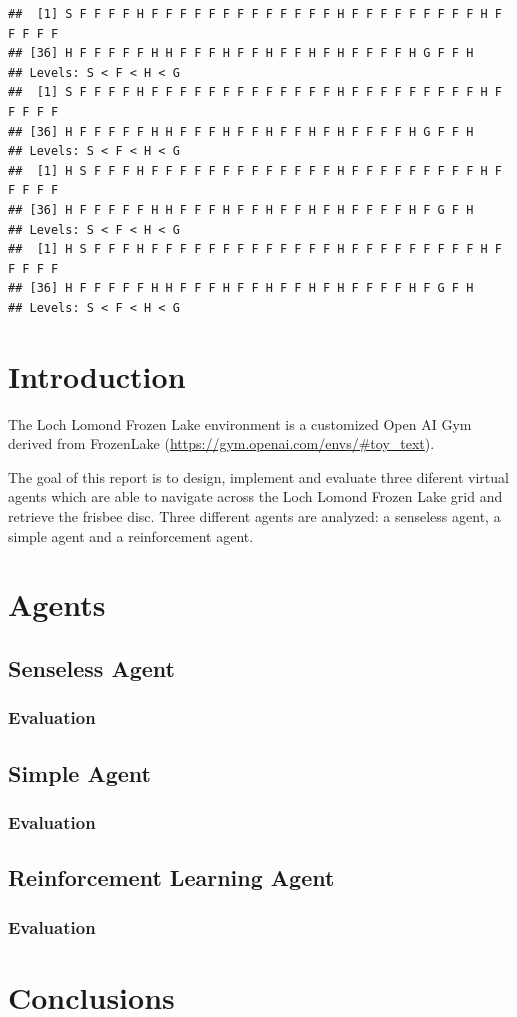 \documentclass[11pt,]{article}
\begin{document}
\begin{verbatim}
##  [1] S F F F F H F F F F F F F F F F F F F H F F F F F F F F F H F F F F F
## [36] H F F F F F H H F F F H F F H F F H F H F F F F H G F F H
## Levels: S < F < H < G
##  [1] S F F F F H F F F F F F F F F F F F F H F F F F F F F F F H F F F F F
## [36] H F F F F F H H F F F H F F H F F H F H F F F F H G F F H
## Levels: S < F < H < G
##  [1] H S F F F H F F F F F F F F F F F F F H F F F F F F F F F H F F F F F
## [36] H F F F F F H H F F F H F F H F F H F H F F F F H F G F H
## Levels: S < F < H < G
##  [1] H S F F F H F F F F F F F F F F F F F H F F F F F F F F F H F F F F F
## [36] H F F F F F H H F F F H F F H F F H F H F F F F H F G F H
## Levels: S < F < H < G
\end{verbatim}

\section{Introduction}\label{introduction}

The Loch Lomond Frozen Lake environment is a customized Open AI Gym
derived from FrozenLake (\url{https://gym.openai.com/envs/\#toy_text}).

The goal of this report is to design, implement and evaluate three
diferent virtual agents which are able to navigate across the Loch
Lomond Frozen Lake grid and retrieve the frisbee disc. Three different
agents are analyzed: a senseless agent, a simple agent and a
reinforcement agent.

\section{Agents}\label{agents}

\subsection{Senseless Agent}\label{senseless-agent}

\subsubsection{Evaluation}\label{evaluation}

\subsection{Simple Agent}\label{simple-agent}

\subsubsection{Evaluation}\label{evaluation-1}

\subsection{Reinforcement Learning
Agent}\label{reinforcement-learning-agent}

\subsubsection{Evaluation}\label{evaluation-2}

\section{Conclusions}\label{sec:con}
\end{document}
